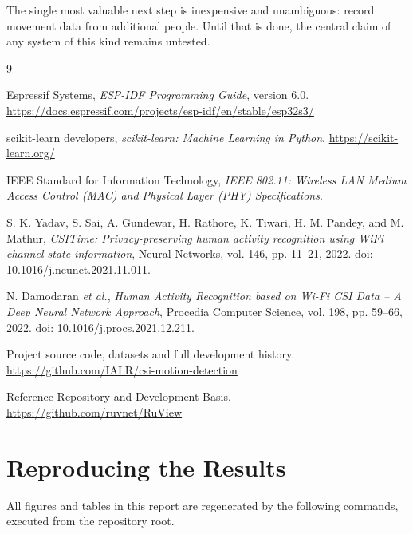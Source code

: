 \documentclass[11pt,a4paper,oneside]{report}
\begin{document}
The single most valuable next step is inexpensive and unambiguous: record
movement data from additional people. Until that is done, the central claim of
any system of this kind remains untested.

\begin{thebibliography}{9}

Espressif Systems,
\emph{ESP-IDF Programming Guide}, version 6.0.
\url{https://docs.espressif.com/projects/esp-idf/en/stable/esp32s3/}

scikit-learn developers,
\emph{scikit-learn: Machine Learning in Python}.
\url{https://scikit-learn.org/}

IEEE Standard for Information Technology,
\emph{IEEE 802.11: Wireless LAN Medium Access Control (MAC) and Physical Layer
(PHY) Specifications}.

S. K. Yadav, S. Sai, A. Gundewar, H. Rathore, K. Tiwari,
H. M. Pandey, and M. Mathur,
\emph{CSITime: Privacy-preserving human activity recognition using WiFi
channel state information},
Neural Networks, vol. 146, pp. 11--21, 2022.
doi: 10.1016/j.neunet.2021.11.011.

N. Damodaran \emph{et al.},
\emph{Human Activity Recognition based on Wi-Fi CSI Data -- A Deep Neural
Network Approach},
Procedia Computer Science, vol. 198, pp. 59--66, 2022.
doi: 10.1016/j.procs.2021.12.211.

Project source code, datasets and full development history.
\url{https://github.com/IALR/csi-motion-detection}

Reference Repository and Development Basis.
\url{https://github.com/ruvnet/RuView}

\end{thebibliography}

\appendix
\chapter{Reproducing the Results}
\label{app:repro}

All figures and tables in this report are regenerated by the following
commands, executed from the repository root.
\end{document}
